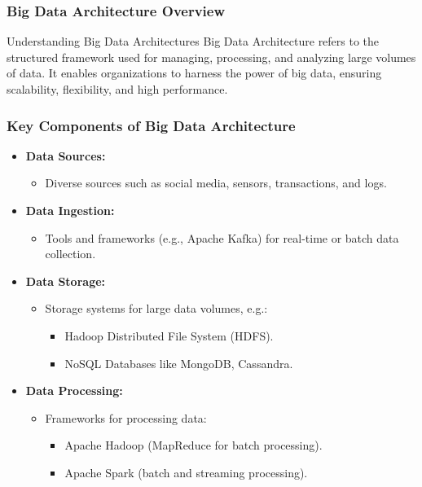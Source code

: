 \documentclass[aspectratio=169]{beamer}
\begin{document}
\begin{frame}[fragile]
    \frametitle{Big Data Architecture Overview}
    \begin{block}{Understanding Big Data Architectures}
        Big Data Architecture refers to the structured framework used for managing, processing, and analyzing large volumes of data. It enables organizations to harness the power of big data, ensuring scalability, flexibility, and high performance.
    \end{block}
\end{frame}

\begin{frame}[fragile]
    \frametitle{Key Components of Big Data Architecture}
    \begin{itemize}
        \item \textbf{Data Sources:}
        \begin{itemize}
            \item Diverse sources such as social media, sensors, transactions, and logs.
        \end{itemize}
        
        \item \textbf{Data Ingestion:}
        \begin{itemize}
            \item Tools and frameworks (e.g., Apache Kafka) for real-time or batch data collection.
        \end{itemize}
        
        \item \textbf{Data Storage:}
        \begin{itemize}
            \item Storage systems for large data volumes, e.g.:
            \begin{itemize}
                \item Hadoop Distributed File System (HDFS).
                \item NoSQL Databases like MongoDB, Cassandra.
            \end{itemize}
        \end{itemize}
        
        \item \textbf{Data Processing:}
        \begin{itemize}
            \item Frameworks for processing data:
            \begin{itemize}
                \item Apache Hadoop (MapReduce for batch processing).
                \item Apache Spark (batch and streaming processing).
            \end{itemize}
        \end{itemize}
    \end{itemize}
\end{frame}
\end{document}
